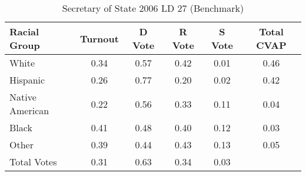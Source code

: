 \begin{table}[htb]
\begin{center}
\caption{Secretary of State 2006 LD 27 (Benchmark)}
\label{sos06_cvap_ld_27_benchmark}
\begin{tabular}{lccccc}
  \hline
Racial Group & Turnout & D Vote & R Vote & S Vote & Total CVAP \\ 
  \hline
White & 0.34 & 0.57 & 0.42 & 0.01 & 0.46 \\ 
  Hispanic & 0.26 & 0.77 & 0.20 & 0.02 & 0.42 \\ 
  Native American & 0.22 & 0.56 & 0.33 & 0.11 & 0.04 \\ 
  Black & 0.41 & 0.48 & 0.40 & 0.12 & 0.03 \\ 
  Other & 0.39 & 0.44 & 0.43 & 0.13 & 0.05 \\ 
  Total Votes & 0.31 & 0.63 & 0.34 & 0.03 &  \\ 
   \hline
\end{tabular}
\end{center}
\end{table}
